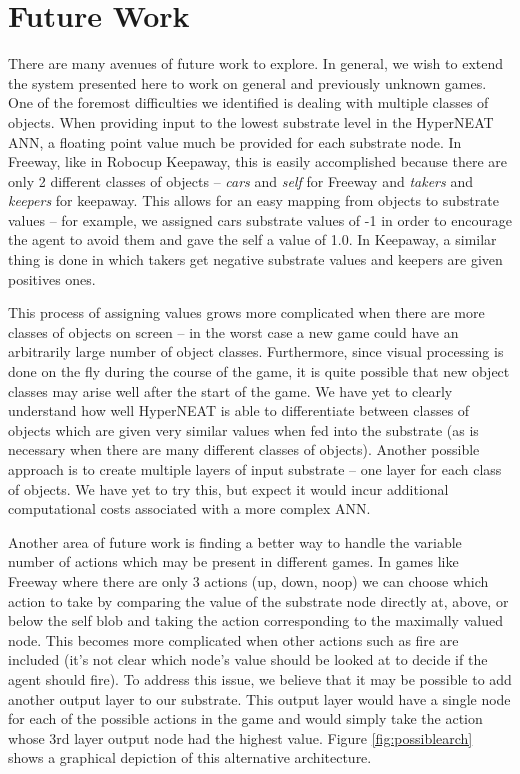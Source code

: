 \documentclass{acm_proc_article-sp}
\begin{document}
\section{Future Work}
\label{sec:futurework}
There are many avenues of future work to explore. In general, we wish to extend the system presented here to work on general and previously unknown games. One of the foremost difficulties we identified is dealing with multiple classes of objects. When providing input to the lowest substrate level in the HyperNEAT ANN, a floating point value much be provided for each substrate node. In Freeway, like in Robocup Keepaway, this is easily accomplished because there are only 2 different classes of objects -- \textit{cars} and \textit{self} for Freeway and \textit{takers} and \textit{keepers} for keepaway. This allows for an easy mapping from objects to substrate values -- for example, we assigned cars substrate values of -1 in order to encourage the agent to avoid them and gave the self a value of 1.0. In Keepaway, a similar thing is done in which takers get negative substrate values and keepers are given positives ones. 

This process of assigning values grows more complicated when there are more classes of objects on screen -- in the worst case a new game could have an arbitrarily large number of object classes. Furthermore, since visual processing is done on the fly during the course of the game, it is quite possible that new object classes may arise well after the start of the game. We have yet to clearly understand how well HyperNEAT is able to differentiate between classes of objects which are given very similar values when fed into the substrate (as is necessary when there are many different classes of objects). Another possible approach is to create multiple layers of input substrate -- one layer for each class of objects. We have yet to try this, but expect it would incur additional computational costs associated with a more complex ANN.

Another area of future work is finding a better way to handle the variable number of actions which may be present in different games. In games like Freeway where there are only 3 actions (up, down, noop) we can choose which action to take by comparing the value of the substrate node directly at, above, or below the self blob and taking the action corresponding to the maximally valued node. This becomes more complicated when other actions such as fire are included (it's not clear which node's value should be looked at to decide if the agent should fire). To address this issue, we believe that it may be possible to add another output layer to our substrate. This output layer would have a single node for each of the possible actions in the game and would simply take the action whose 3rd layer output node had the highest value. Figure \ref{fig:possiblearch} shows a graphical depiction of this alternative architecture.
\end{document}
